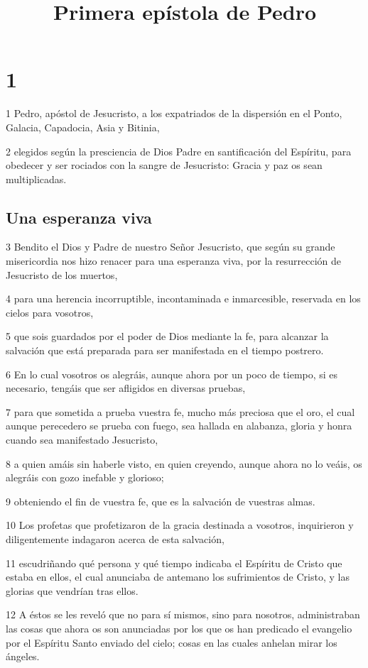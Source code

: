 
\title{Primera epístola de Pedro}

\chapter{1}

\par 1 Pedro, apóstol de Jesucristo, a los expatriados de la dispersión en el Ponto, Galacia, Capadocia, Asia y Bitinia,
\par 2 elegidos según la presciencia de Dios Padre en santificación del Espíritu, para obedecer y ser rociados con la sangre de Jesucristo: Gracia y paz os sean multiplicadas.

\section*{Una esperanza viva}

\par 3 Bendito el Dios y Padre de nuestro Señor Jesucristo, que según su grande misericordia nos hizo renacer para una esperanza viva, por la resurrección de Jesucristo de los muertos,
\par 4 para una herencia incorruptible, incontaminada e inmarcesible, reservada en los cielos para vosotros,
\par 5 que sois guardados por el poder de Dios mediante la fe, para alcanzar la salvación que está preparada para ser manifestada en el tiempo postrero.
\par 6 En lo cual vosotros os alegráis, aunque ahora por un poco de tiempo, si es necesario, tengáis que ser afligidos en diversas pruebas,
\par 7 para que sometida a prueba vuestra fe, mucho más preciosa que el oro, el cual aunque perecedero se prueba con fuego, sea hallada en alabanza, gloria y honra cuando sea manifestado Jesucristo,
\par 8 a quien amáis sin haberle visto, en quien creyendo, aunque ahora no lo veáis, os alegráis con gozo inefable y glorioso;
\par 9 obteniendo el fin de vuestra fe, que es la salvación de vuestras almas.
\par 10 Los profetas que profetizaron de la gracia destinada a vosotros, inquirieron y diligentemente indagaron acerca de esta salvación,
\par 11 escudriñando qué persona y qué tiempo indicaba el Espíritu de Cristo que estaba en ellos, el cual anunciaba de antemano los sufrimientos de Cristo, y las glorias que vendrían tras ellos.
\par 12 A éstos se les reveló que no para sí mismos, sino para nosotros, administraban las cosas que ahora os son anunciadas por los que os han predicado el evangelio por el Espíritu Santo enviado del cielo; cosas en las cuales anhelan mirar los ángeles.

